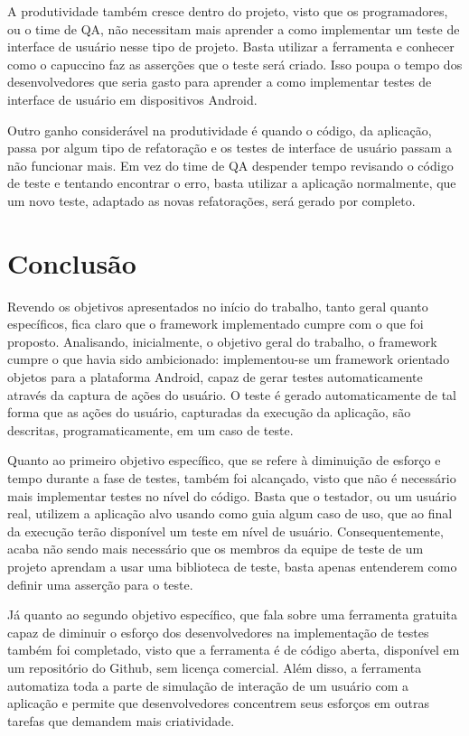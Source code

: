 \documentclass[
    12pt,       %
    openright,      %
    twoside,      %
    a4paper,      %
    english,      %
    french,       %
    spanish,      %
    brazil,       %
    ]{abntex2}
\begin{document}
      A produtividade também cresce dentro do projeto, visto que os programadores, ou o time de QA, não
      necessitam mais aprender a como implementar um teste de interface de usuário nesse tipo de projeto.
      Basta utilizar a ferramenta e conhecer como o capuccino faz as asserções que o teste será criado.
      Isso poupa o tempo dos desenvolvedores que seria gasto para aprender a como implementar testes de
      interface de usuário em dispositivos Android.

      Outro ganho considerável na produtividade é quando o código, da aplicação, passa por algum tipo de
      refatoração e os testes de interface de usuário passam a não funcionar mais. Em vez do time de QA
      despender tempo revisando o código de teste e tentando encontrar o erro, basta utilizar a aplicação
      normalmente, que um novo teste, adaptado as novas refatorações, será gerado por completo.

    \chapter{Conclusão}
      Revendo os objetivos apresentados no início do trabalho, tanto geral quanto específicos, fica claro
      que o framework implementado cumpre com o que foi proposto. Analisando, inicialmente, o objetivo
      geral do trabalho, o framework cumpre o que havia sido ambicionado: implementou-se um framework
      orientado objetos para a plataforma Android, capaz de gerar testes automaticamente através da captura
      de ações do usuário. O teste é gerado automaticamente de tal forma que as ações do usuário, capturadas
      da execução da aplicação, são descritas, programaticamente, em um caso de teste.

      Quanto ao primeiro objetivo específico, que se refere à diminuição de esforço e tempo durante a fase de
      testes, também foi alcançado, visto que não é necessário mais implementar testes no nível do código.
      Basta que o testador, ou um usuário real, utilizem a aplicação alvo usando como guia algum caso de uso,
      que ao final da execução terão disponível um teste em nível de usuário. Consequentemente, acaba não sendo
      mais necessário que os membros da equipe de teste de um projeto aprendam a usar uma biblioteca de teste,
      basta apenas entenderem como definir uma asserção para o teste.

      Já quanto ao segundo objetivo específico, que fala sobre uma ferramenta gratuita capaz de diminuir
      o esforço dos desenvolvedores na implementação de testes também foi completado, visto que a ferramenta
      é de código aberta, disponível em um repositório do Github, sem licença comercial. Além disso, a
      ferramenta automatiza toda a parte de simulação de interação de um usuário com a aplicação e permite
      que desenvolvedores concentrem seus esforços em outras tarefas que demandem mais criatividade.
\end{document}
